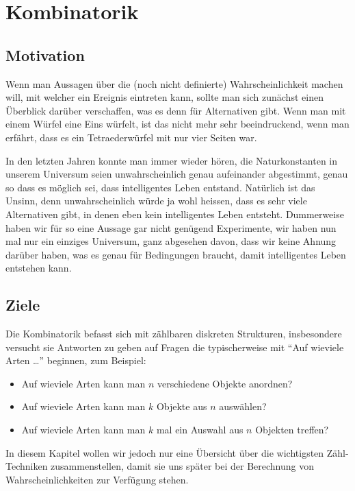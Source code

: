 %
%
%
\chapter{Kombinatorik} \label{chapter:kombinatorik}
\section{Motivation}
Wenn man Aussagen über die (noch nicht definierte) Wahrscheinlichkeit
machen will, mit welcher ein Ereignis eintreten kann, sollte man sich
zunächst einen Überblick darüber verschaffen, was es denn für
Alternativen gibt.
Wenn man mit einem Würfel eine Eins würfelt, ist
das nicht mehr sehr beeindruckend, wenn man erfährt, dass es ein
Tetraederwürfel mit nur vier Seiten war. 

In den letzten Jahren konnte man immer wieder hören, die Naturkonstanten
in unserem Universum seien unwahrscheinlich genau aufeinander abgestimmt,
genau so dass es möglich sei, dass intelligentes Leben entstand.
Natürlich ist das Unsinn, denn unwahrscheinlich würde ja wohl
heissen, dass es sehr viele Alternativen gibt, in denen eben kein
intelligentes Leben entsteht.
Dummerweise haben wir für so eine Aussage
gar nicht genügend Experimente, wir haben nun mal nur ein einziges
Universum, ganz abgesehen davon, dass wir keine Ahnung darüber haben,
was es genau für Bedingungen braucht, damit intelligentes Leben
entstehen kann.

\section{Ziele}
Die Kombinatorik befasst sich mit zählbaren diskreten Strukturen,
insbesondere versucht sie Antworten zu geben auf Fragen die
typischerweise mit ``Auf wieviele Arten \dots'' beginnen, zum Beispiel:
\begin{itemize}
\item Auf wieviele Arten kann man $n$ verschiedene Objekte anordnen?
\item Auf wieviele Arten kann man $k$ Objekte aus $n$ auswählen?
\item Auf wieviele Arten kann man $k$ mal ein Auswahl aus $n$ Objekten
treffen?
\end{itemize}

In diesem Kapitel wollen wir jedoch nur eine Übersicht über die
wichtigsten Zähl-Techniken zusammenstellen, damit sie uns später
bei der Berechnung von Wahrscheinlichkeiten zur Verfügung stehen.

